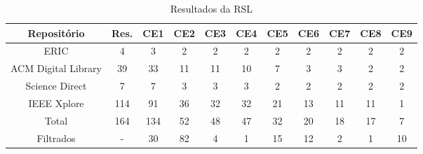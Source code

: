 \begin{table}[!htbp]
    \begin{center}
    \begin{footnotesize}
    \caption{Resultados da RSL}
    \label{rsl_table}

    \begin{tabular}{|c|c|c|c|c|c|c|c|c|c|c|} \hline
        Repositório         & Res. & CE1 & CE2 & CE3 & CE4 & CE5 & CE6 & CE7 & CE8 & CE9 \\ \hline
        ERIC                & 4  &  3  &  2 &  2 &  2 &  2 & 2  &  2 &  2 & 2  \\ \hline
        ACM Digital Library & 39 & 33  & 11 & 11 & 10 &  7 & 3  &  3 &  2 & 2  \\ \hline
        Science Direct      &  7 &  7  &  3 &  3 &  3 &  2 & 2  &  2 &  2 & 2  \\ \hline
        IEEE Xplore        & 114 & 91  & 36 & 32 & 32 & 21 & 13 & 11 & 11 & 1  \\ \hline
        Total              & 164 & 134 & 52 & 48 & 47 & 32 & 20 & 18 & 17 & 7  \\ \hline 
        Filtrados          & -   &  30 & 82 &  4 &  1 & 15 & 12 &  2 & 1  & 10 \\ \hline 
    \end{tabular}
    
    \end{footnotesize}
    \end{center}
    \sourceauthor
\end{table}

